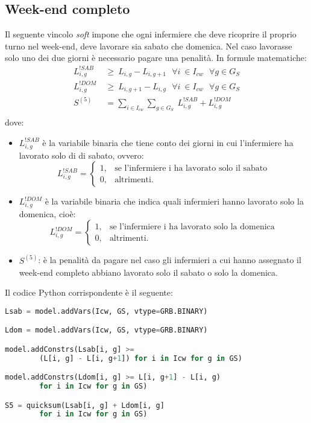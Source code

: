 \subsection{Week-end completo}
Il seguente vincolo \textit{soft} impone che ogni infermiere che deve ricoprire il proprio turno nel week-end, deve lavorare sia sabato che domenica. Nel caso lavorasse solo uno dei due giorni è necessario pagare una penalità.
In formule matematiche:
\begin{equation}
\begin{split}
L_{i, g}^{!SAB} ~ &\geq ~ L_{i, g} - L_{i, g+1}  ~~~ \forall i ~ \in I_{cw} ~~~ \forall g \in G_S \\
L_{i, g}^{!DOM} ~ &\geq ~ L_{i, g+1} - L_{i, g} ~~~ \forall i ~ \in I_{cw} ~~~ \forall g \in G_S \\
S^{(5)} &= \sum_{i \in I_{cw}} \sum_{g \in G_S} ~ L_{i, g}^{!SAB} + L_{i, g}^{!DOM} \\
\end{split}
\end{equation}
dove: 
\begin{itemize}
\item $L_{i, g}^{!SAB}$ è la variabile binaria che tiene conto dei giorni in cui l'infermiere ha lavorato solo di di sabato, ovvero:
\begin{equation}
\label{eq:varLavoratoSoloSabato}
L_{i, g}^{!SAB}=
\begin{cases}
1, & \text{se l'infermiere i ha lavorato solo il sabato} \\
0, & \text{altrimenti.}
\end{cases}
\end{equation}
\item $L_{i, g}^{!DOM}$ è la variabile binaria che indica quali infermieri hanno lavorato solo la domenica, cioè:
\begin{equation}
\label{eq:varLavoratoSoloDomenica}
L_{i, g}^{!DOM}=
\begin{cases}
1, & \text{se l'infermiere i ha lavorato solo la domenica} \\
0, & \text{altrimenti.}
\end{cases}
\end{equation}
\item $S^{(5)}$: è la penalità da pagare nel caso gli infermieri a cui hanno assegnato il week-end completo abbiano lavorato solo il sabato o solo la domenica.
\end{itemize}

Il codice Python corrispondente è il seguente:
\begin{lstlisting}[language=Python]
Lsab = model.addVars(Icw, GS, vtype=GRB.BINARY)

Ldom = model.addVars(Icw, GS, vtype=GRB.BINARY)

model.addConstrs(Lsab[i, g] >= 
		(L[i, g] - L[i, g+1]) for i in Icw for g in GS)

model.addConstrs(Ldom[i, g] >= L[i, g+1] - L[i, g) 
		for i in Icw for g in GS)

S5 = quicksum(Lsab[i, g] + Ldom[i, g] 
		for i in Icw for g in GS)
\end{lstlisting}

